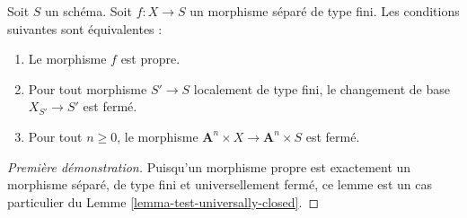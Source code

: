 \begin{lemma}
\label{lemma-limited-base-change}
Soit $S$ un schéma.
Soit $f : X \to S$ un morphisme séparé de type fini.
Les conditions suivantes sont équivalentes :
\begin{enumerate}
\item Le morphisme $f$ est propre.
\item Pour tout morphisme $S' \to S$ localement de type fini,
le changement de base $X_{S'} \to S'$ est fermé.
\item Pour tout $n \geq 0$, le morphisme
$\mathbf{A}^n \times X \to \mathbf{A}^n \times S$ est fermé.
\end{enumerate}
\end{lemma}

\begin{proof}[Première démonstration]
Puisqu'un morphisme propre est exactement un morphisme
séparé, de type fini et universellement fermé, ce
lemme est un cas particulier du Lemme \ref{lemma-test-universally-closed}.
\end{proof}

